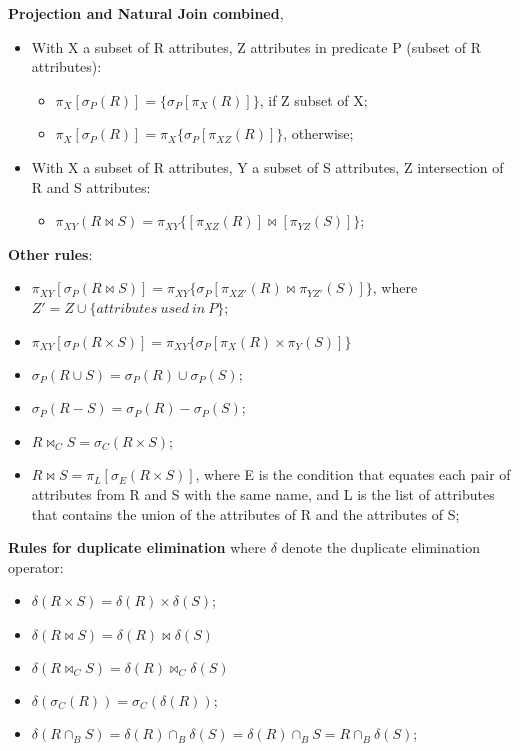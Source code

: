 \documentclass{article}
\begin{document}
\clearpage
\textbf{Projection and Natural Join combined}, 
\begin{itemize}
\item With X a subset of R attributes, Z attributes in predicate P (subset of R attributes):
\begin{itemize}
\item $\pi_X[\sigma_P(R)] = \{ \sigma_P [ \pi_X (R) ] \}$, if Z subset of X;
\item $\pi_X[\sigma_P(R)] = \pi_X \{ \sigma_P [ \pi_{XZ} (R) ]\}$, otherwise; 
\end{itemize}
\item With X a subset of R attributes, Y a subset of S attributes, Z intersection of R and S attributes:
\begin{itemize}
\item $\pi_{XY}(R \bowtie S) = \pi_{XY}\{[\pi_{XZ}(R)] \bowtie [\pi_{YZ}(S)]\}$;
\end{itemize}
\end{itemize}
\textbf{Other rules}:
\begin{itemize}
\item $\pi_{XY}[\sigma_P (R \bowtie S)] = \pi_{XY} \{ \sigma_P [ \pi_{XZ'} (R) \bowtie \pi_{YZ'} (S)] \}$, where $Z' = Z \cup \{attributes\ used\ in\ P\}$;
\item $\pi_{XY}[\sigma_P (R \times S)] =  \pi_{XY} \{ \sigma_P [ \pi_{X} (R) \times \pi_{Y} (S)] \}$
\item $\sigma_P(R \cup S) = \sigma_P(R) \cup \sigma_P(S)$; 
\item $\sigma_P(R - S) = \sigma_P(R) - \sigma_P(S)$; 
\item $R \bowtie_C S = \sigma_C (R \times S)$;
\item $R \bowtie S = \pi_L [\sigma_E(R \times S)]$, where E is the condition that equates each pair of attributes from R and S with the same name, and L is the list of attributes that contains the union of the attributes of R and the attributes of S;
\end{itemize}
\textbf{Rules for duplicate elimination} where $\delta$ denote the duplicate elimination operator:
\begin{itemize}
\item $\delta (R \times S) = \delta (R) \times \delta (S)$;
\item $\delta (R \bowtie S) = \delta (R) \bowtie \delta (S)$
\item $\delta (R \bowtie_C S) = \delta (R) \bowtie_C \delta (S)$
\item $\delta (\sigma_C(R)) = \sigma_C(\delta(R))$;
\item $\delta (R \cap_B S) = \delta (R) \cap_B \delta (S) =  \delta (R) \cap_B S =  R \cap_B \delta (S)$;
\end{itemize}
\end{document}
